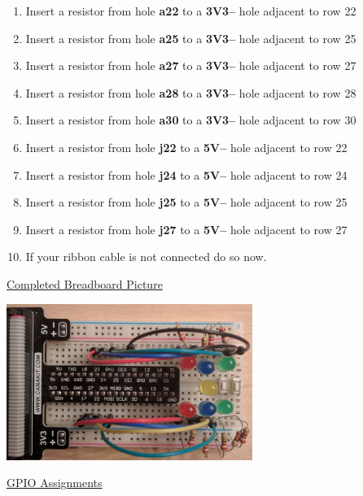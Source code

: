 \begin{enumerate}
	\item Insert a resistor from hole \textbf{a22} to a \textbf{3V3--} hole adjacent to row 22
	\item Insert a resistor from hole \textbf{a25} to a \textbf{3V3--} hole adjacent to row 25
	\item Insert a resistor from hole \textbf{a27} to a \textbf{3V3--} hole adjacent to row 27	
	\item Insert a resistor from hole \textbf{a28} to a \textbf{3V3--} hole adjacent to row 28
	\item Insert a resistor from hole \textbf{a30} to a \textbf{3V3--} hole adjacent to row 30
	\item Insert a resistor from hole \textbf{j22} to a \textbf{5V--} hole adjacent to row 22
	\item Insert a resistor from hole \textbf{j24} to a \textbf{5V--} hole adjacent to row 24	
	\item Insert a resistor from hole \textbf{j25} to a \textbf{5V--} hole adjacent to row 25
	\item Insert a resistor from hole \textbf{j27} to a \textbf{5V--} hole adjacent to row 27
	
	\item If your ribbon cable is not connected do so now.
\end{enumerate}

\underline{Completed Breadboard Picture}

\beforefig
\centerline{\includegraphics[height=2in]{pi_images/lab05images/PiLab05-DieLightPhoto.jpg}}
\afterfig

\newpage

\underline{GPIO Assignments}

